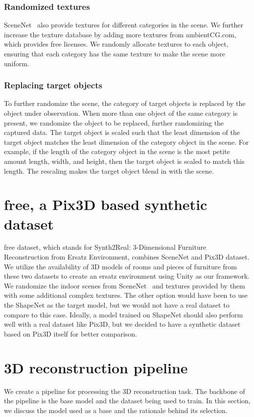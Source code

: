 \subsubsection{Randomized textures}
SceneNet~\cite{McCormac:etal:ICCV2017} also provide textures for different categories in the scene.
We further increase the texture database by adding more textures from ambientCG.com, which provides free licenses.
We randomly allocate textures to each object, ensuring that each category has the same texture to make the scene more uniform.

\subsubsection{Replacing target objects}
To further randomize the scene, the category of target objects is replaced by the object under observation.
When more than one object of the same category is present, we randomize the object to be replaced, further randomizing the captured data.
The target object is scaled such that the least dimension of the target object matches the least dimension of the category object in the scene.
For example, if the length of the category object in the scene is the most petite amount length, width, and height, then the target object is scaled to match this length.
The rescaling makes the target object blend in with the scene.

\section{\gls{free}, a Pix3D based synthetic dataset}\label{sec:s2r:3d-free-a-pix3d-based-synthetic-dataset}

\gls{free} dataset, which stands for Synth2Real: 3-Dimensional Furniture Reconstruction from Ersatz Environment, combines SceneNet and Pix3D dataset.
We utilize the availability of 3D models of rooms and pieces of furniture from these two datasets to create an ersatz environment using Unity as our framework.
We randomize the indoor scenes from SceneNet~\cite{McCormac:etal:ICCV2017} and textures provided by them with some additional complex textures.
The other option would have been to use the ShapeNet as the target model, but we would not have a real dataset to compare to this case.
Ideally, a model trained on ShapeNet should also perform well with a real dataset like Pix3D, but we decided to have a synthetic dataset based on Pix3D itself for better comparison.

\section{3D reconstruction pipeline}\label{sec:3D reconstruction pipeline}
We create a pipeline for processing the 3D reconstruction task.
The backbone of the pipeline is the base model and the dataset being used to train.
In this section, we discuss the model used as a base and the rationale behind its selection.

